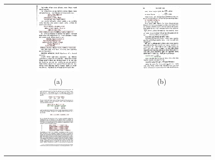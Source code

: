 \documentclass[12pt]{IEEEtran}
\begin{document}
\begin{figure}[h]\center\footnotesize
\begin{tabular}{|c|c|}
\hline
 \includegraphics[width=0.42\textwidth]{result1.png} &
 \includegraphics[width=0.42\textwidth]{result2.png} \\
 (a)  &(b)  \\
 \hline
  \includegraphics[width=0.42\textwidth]{result_3.png} &

\end{tabular}
\end{figure}
\end{document}
